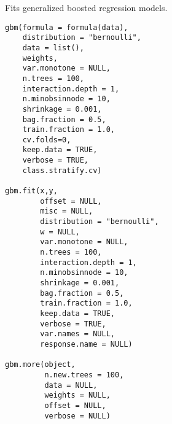 \begin{Description}\relax
Fits generalized boosted regression models.
\end{Description}
\begin{Usage}
\begin{verbatim}
gbm(formula = formula(data),
    distribution = "bernoulli",
    data = list(),
    weights,
    var.monotone = NULL,
    n.trees = 100,
    interaction.depth = 1,
    n.minobsinnode = 10,
    shrinkage = 0.001,
    bag.fraction = 0.5,
    train.fraction = 1.0,
    cv.folds=0,
    keep.data = TRUE,
    verbose = TRUE,
    class.stratify.cv)

gbm.fit(x,y,
        offset = NULL,
        misc = NULL,
        distribution = "bernoulli",
        w = NULL,
        var.monotone = NULL,
        n.trees = 100,
        interaction.depth = 1,
        n.minobsinnode = 10,
        shrinkage = 0.001,
        bag.fraction = 0.5,
        train.fraction = 1.0,
        keep.data = TRUE,
        verbose = TRUE,
        var.names = NULL,
        response.name = NULL)

gbm.more(object,
         n.new.trees = 100,
         data = NULL,
         weights = NULL,
         offset = NULL,
         verbose = NULL)
\end{verbatim}
\end{Usage}

